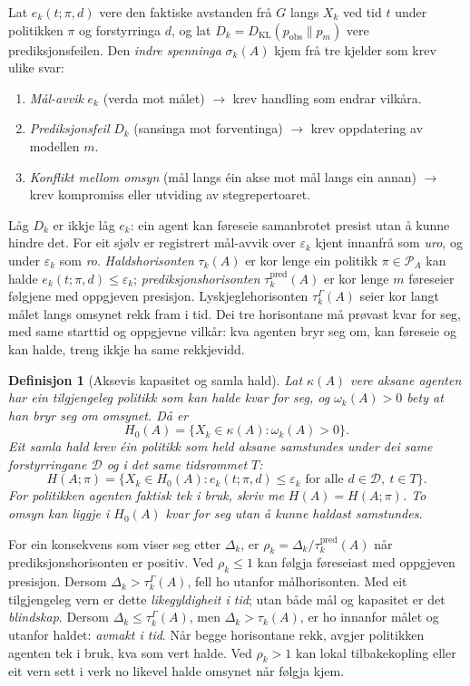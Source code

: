 \documentclass[9pt,twocolumn,a4paper]{article}
\theoremstyle{defstyle}
\newtheorem{definisjon}{Definisjon}
\theoremstyle{formstyle}
\begin{document}
Lat $e_k(t; \pi, d)$ vere den faktiske avstanden frå $G$ langs $X_k$ ved tid $t$ under politikken $\pi$ og forstyrringa $d$, og lat $D_k = D_{\mathrm{KL}}(p_{\mathrm{obs}} \parallel p_m)$ vere prediksjonsfeilen. Den \emph{indre spenninga} $\sigma_k(A)$ kjem frå tre kjelder som krev ulike svar:
\begin{enumerate}
\item \emph{Mål-avvik} $e_k$ (verda mot målet) $\to$ krev handling som endrar vilkåra.
\item \emph{Prediksjonsfeil} $D_k$ (sansinga mot forventinga) $\to$ krev oppdatering av modellen $m$.
\item \emph{Konflikt mellom omsyn} (mål langs éin akse mot mål langs ein annan) $\to$ krev kompromiss eller utviding av stegrepertoaret.
\end{enumerate}
Låg $D_k$ er ikkje låg $e_k$: ein agent kan føreseie samanbrotet presist utan å kunne hindre det. For eit sjølv er registrert mål-avvik over $\varepsilon_k$ kjent innanfrå som \emph{uro}, og under $\varepsilon_k$ som \emph{ro}. \emph{Haldshorisonten} $\tau_k(A)$ er kor lenge ein politikk $\pi \in \mathcal{P}_A$ kan halde $e_k(t; \pi, d) \leq \varepsilon_k$; \emph{prediksjonshorisonten} $\tau_k^{\mathrm{pred}}(A)$ er kor lenge $m$ føreseier følgjene med oppgjeven presisjon. Lyskjeglehorisonten $\tau_k^{\Gamma}(A)$ seier kor langt målet langs omsynet rekk fram i tid. Dei tre horisontane må prøvast kvar for seg, med same starttid og oppgjevne vilkår: kva agenten bryr seg om, kan føreseie og kan halde, treng ikkje ha same rekkjevidd.

\begin{definisjon}[Aksevis kapasitet og samla hald]
Lat $\kappa(A)$ vere aksane agenten har ein tilgjengeleg politikk som kan halde kvar for seg, og $\omega_k(A)>0$ bety at han bryr seg om omsynet. Då er
\[
H_0(A)=\{X_k\in\kappa(A):\omega_k(A)>0\}.
\]
Eit samla hald krev éin politikk som held aksane samstundes under dei same forstyrringane $\mathcal D$ og i det same tidsrommet $T$:
\[
H(A;\pi)=\{X_k\in H_0(A):e_k(t;\pi,d)\leq\varepsilon_k
\text{ for alle }d\in\mathcal D,\ t\in T\}.
\]
For politikken agenten faktisk tek i bruk, skriv me $H(A)=H(A;\pi)$. To omsyn kan liggje i $H_0(A)$ kvar for seg utan å kunne haldast samstundes.
\end{definisjon}

For ein konsekvens som viser seg etter $\Delta_k$, er $\rho_k=\Delta_k/\tau_k^{\mathrm{pred}}(A)$ når prediksjonshorisonten er positiv. Ved $\rho_k\leq1$ kan følgja føreseiast med oppgjeven presisjon. Dersom $\Delta_k>\tau_k^\Gamma(A)$, fell ho utanfor målhorisonten. Med eit tilgjengeleg vern er dette \emph{likegyldigheit i tid}; utan både mål og kapasitet er det \emph{blindskap}. Dersom $\Delta_k\leq\tau_k^\Gamma(A)$, men $\Delta_k>\tau_k(A)$, er ho innanfor målet og utanfor haldet: \emph{avmakt i tid}. Når begge horisontane rekk, avgjer politikken agenten tek i bruk, kva som vert halde. Ved $\rho_k>1$ kan lokal tilbakekopling eller eit vern sett i verk no likevel halde omsynet når følgja kjem.
\end{document}
